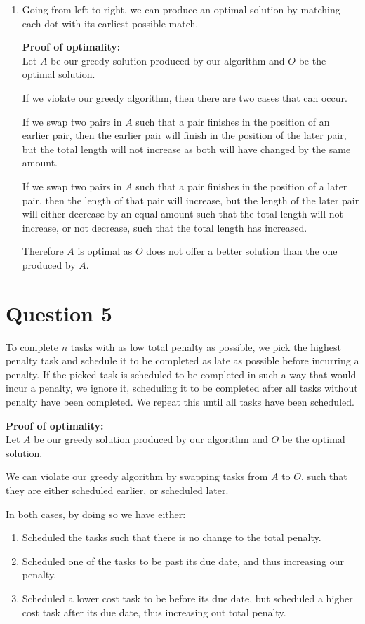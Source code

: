 \documentclass{article}
\begin{document}
\begin{enumerate}[label=\alph*)]
    \item
        Going from left to right, we can produce an optimal solution by matching each dot with its earliest possible match.

        \textbf{Proof of optimality:}\\
        Let $A$ be our greedy solution produced by our algorithm and $O$ be the optimal solution.

        If we violate our greedy algorithm, then there are two cases that can occur.

        If we swap two pairs in $A$ such that a pair finishes in the position of an earlier pair, then the earlier pair will finish in the position of the later pair, but the total length will not increase as both will have changed by the same amount.

        If we swap two pairs in $A$ such that a pair finishes in the position of a later pair, then the length of that pair will increase, but the length of the later pair will either decrease by an equal amount such that the total length will not increase, or not decrease, such that the total length has increased.

        Therefore $A$ is optimal as $O$ does not offer a better solution than the one produced by $A$.

\end{enumerate}

\section*{Question 5}
To complete $n$ tasks with as low total penalty as possible, we pick the highest penalty task and schedule it to be completed as late as possible before incurring a penalty. If the picked task is scheduled to be completed in such a way that would incur a penalty, we ignore it, scheduling it to be completed after all tasks without penalty have been completed. We repeat this until all tasks have been scheduled.

\textbf{Proof of optimality:}\\
Let $A$ be our greedy solution produced by our algorithm and $O$ be the optimal solution.

We can violate our greedy algorithm by swapping tasks from $A$ to $O$, such that they are either scheduled earlier, or scheduled later.

In both cases, by doing so we have either:
\begin{enumerate}
    \item Scheduled the tasks such that there is no change to the total penalty.
    \item Scheduled one of the tasks to be past its due date, and thus increasing our penalty.
    \item Scheduled a lower cost task to be before its due date, but scheduled a higher cost task after its due date, thus increasing out total penalty.
\end{enumerate}
\end{document}
